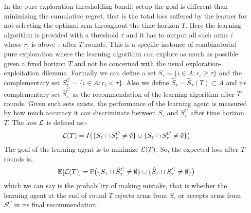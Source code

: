 %
%

	In the pure exploration thresholding bandit setup the goal is different than minimizing the cumulative regret, that is the total loss suffered by the learner for not selecting the optimal arm throughout the time horizon $T$. Here the learning algorithm is provided with a threshold $\tau$ and it has to output all such arms $i$ whose $r_{i}$ is above $\tau$ after $T$ rounds. This is a specific instance of combinatorial pure exploration where the learning algorithm can explore as much as possible given a fixed horizon $T$ and not be concerned with the usual exploration-exploitation dilemma. Formally we can define a set $S_{\tau}=\lbrace i\in A: r_{i}\geq \tau \rbrace$ and the complementary set $S_{\tau}^{C}=\lbrace i\in A: r_{i} < \tau \rbrace$. Also we define $\hat{S}_{\tau}=\hat{S}_{\tau}(T)\subset A$ and its complementary set $\hat{S}_{\tau}^{C}$ as the recommendation of the learning algorithm after $T$ rounds. Given such sets exists, the performance of the learning agent is measured by how much accuracy it can discriminate between $S_{\tau}$ and $S_{\tau}^{C}$ after time horizon $T$. The loss $\mathcal{L}$ is defined as:-
\begin{align*}
\mathcal{L} (T) = I\big(\lbrace S_{\tau}\cap \hat{S}_{\tau}^{C}\neq \emptyset\rbrace    \cup    \lbrace\hat{S}_{\tau}\cap S_{\tau}^{C}\neq \emptyset\rbrace\big)
\end{align*}			
The goal of the learning agent is to minimize $\mathcal{L} (T)$. So, the expected loss after $T$ rounds is,
\begin{align*}
\mathbb{E}[\mathcal{L}(T)] = \mathbb{P}\big(\lbrace S_{\tau}\cap \hat{S}_{\tau}^{C} \neq \emptyset \rbrace  \cup   \lbrace \hat{S}_{\tau}\cap S_{\tau}^{C} \neq \emptyset\rbrace\big)
\end{align*}
which we can say is the probability of making mistake, that is whether the learning agent at the end of round $T$ rejects arms from $S_{\tau}$ or accepts arms from $S_{\tau}^{C}$ in its final recommendation. 

